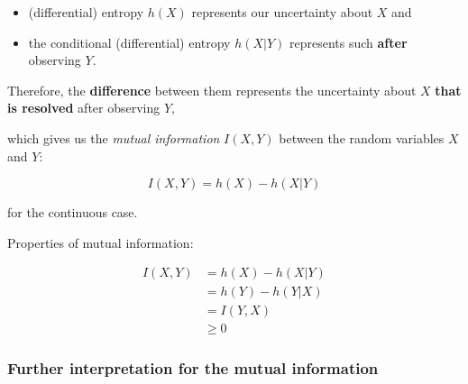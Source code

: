 \begin{frame}{\subsecname}

\begin{itemize}
\item (differential) entropy $h(X)$ represents our uncertainty about $X$ 
and 
\item the conditional (differential) entropy $h(X|Y)$ represents such \textbf{after} observing $Y$.
\end{itemize}

Therefore, the \textbf{difference} between them represents the uncertainty about $X$ \textbf{that is resolved} after observing $Y$,

\pause

which gives us the \emph{mutual information} $I(X,Y)$ between the random variables $X$ and $Y$:

\begin{equation}
I(X,Y) = h(X) - h(X|Y)
\end{equation}

for the continuous case.

\end{frame}

\begin{frame}{\subsecname}

Properties of mutual information:

\begin{align}
\label{eq:mutualcontprops}
I(X,Y) &= h(X) - h(X|Y)\\
&= h(Y) - h(Y|X)\\
&= I(Y,X) \\
&\ge 0
\end{align}

\end{frame}

\subsubsection{Further interpretation for the mutual information}

